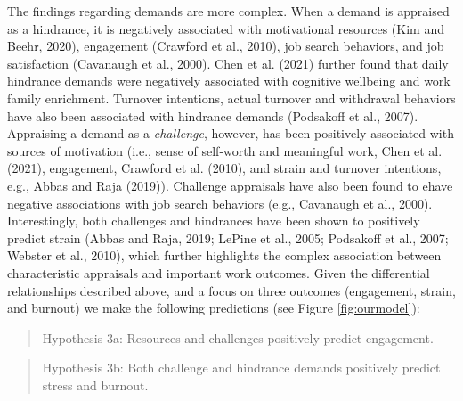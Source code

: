 \documentclass[
  man]{apa7}
\begin{document}
The findings regarding demands are more complex. When a demand is appraised as a hindrance, it is negatively associated with motivational resources (Kim and Beehr, 2020), engagement (Crawford et al., 2010), job search behaviors, and job satisfaction (Cavanaugh et al., 2000). Chen et al. (2021) further found that daily hindrance demands were negatively associated with cognitive wellbeing and work family enrichment. Turnover intentions, actual turnover and withdrawal behaviors have also been associated with hindrance demands (Podsakoff et al., 2007). Appraising a demand as a \emph{challenge}, however, has been positively associated with sources of motivation (i.e., sense of self-worth and meaningful work, Chen et al. (2021), engagement, Crawford et al. (2010), and strain and turnover intentions, e.g., Abbas and Raja (2019)). Challenge appraisals have also been found to ehave negative associations with job search behaviors (e.g., Cavanaugh et al., 2000). Interestingly, both challenges and hindrances have been shown to positively predict strain (Abbas and Raja, 2019; LePine et al., 2005; Podsakoff et al., 2007; Webster et al., 2010), which further highlights the complex association between characteristic appraisals and important work outcomes. Given the differential relationships described above, and a focus on three outcomes (engagement, strain, and burnout) we make the following predictions (see Figure \ref{fig:ourmodel}):

\begin{quote}
Hypothesis 3a: Resources and challenges positively predict engagement.
\end{quote}

\begin{quote}
Hypothesis 3b: Both challenge and hindrance demands positively predict stress and burnout.
\end{quote}
\end{document}
